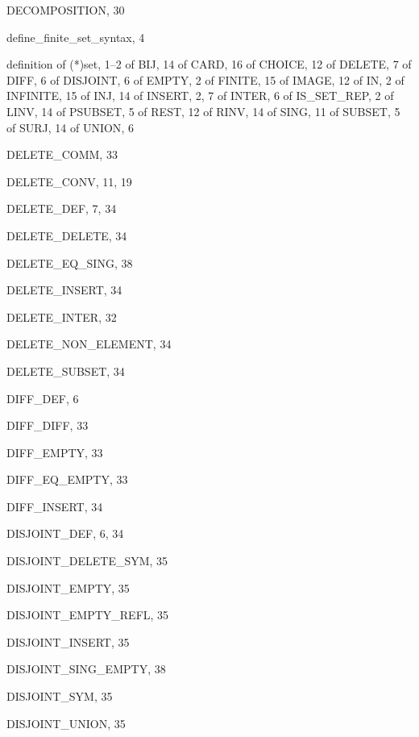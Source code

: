 \begin{theindex}
  \item {\ptt DECOMPOSITION}, 30
  \item {\ptt define\_finite\_set\_syntax}, 4
  \item definition
    \subitem of {\ptt (*)set}, 1--2
    \subitem of {\ptt BIJ}, 14
    \subitem of {\ptt CARD}, 16
    \subitem of {\ptt CHOICE}, 12
    \subitem of {\ptt DELETE}, 7
    \subitem of {\ptt DIFF}, 6
    \subitem of {\ptt DISJOINT}, 6
    \subitem of {\ptt EMPTY}, 2
    \subitem of {\ptt FINITE}, 15
    \subitem of {\ptt IMAGE}, 12
    \subitem of {\ptt IN}, 2
    \subitem of {\ptt INFINITE}, 15
    \subitem of {\ptt INJ}, 14
    \subitem of {\ptt INSERT}, 2, 7
    \subitem of {\ptt INTER}, 6
    \subitem of {\ptt IS\_SET\_REP}, 2
    \subitem of {\ptt LINV}, 14
    \subitem of {\ptt PSUBSET}, 5
    \subitem of {\ptt REST}, 12
    \subitem of {\ptt RINV}, 14
    \subitem of {\ptt SING}, 11
    \subitem of {\ptt SUBSET}, 5
    \subitem of {\ptt SURJ}, 14
    \subitem of {\ptt UNION}, 6
  \item {\ptt DELETE\_COMM}, 33
  \item {\ptt DELETE\_CONV}, 11, 19
  \item {\ptt DELETE\_DEF}, 7, 34
  \item {\ptt DELETE\_DELETE}, 34
  \item {\ptt DELETE\_EQ\_SING}, 38
  \item {\ptt DELETE\_INSERT}, 34
  \item {\ptt DELETE\_INTER}, 32
  \item {\ptt DELETE\_NON\_ELEMENT}, 34
  \item {\ptt DELETE\_SUBSET}, 34
  \item {\ptt DIFF\_DEF}, 6
  \item {\ptt DIFF\_DIFF}, 33
  \item {\ptt DIFF\_EMPTY}, 33
  \item {\ptt DIFF\_EQ\_EMPTY}, 33
  \item {\ptt DIFF\_INSERT}, 34
  \item {\ptt DISJOINT\_DEF}, 6, 34
  \item {\ptt DISJOINT\_DELETE\_SYM}, 35
  \item {\ptt DISJOINT\_EMPTY}, 35
  \item {\ptt DISJOINT\_EMPTY\_REFL}, 35
  \item {\ptt DISJOINT\_INSERT}, 35
  \item {\ptt DISJOINT\_SING\_EMPTY}, 38
  \item {\ptt DISJOINT\_SYM}, 35
  \item {\ptt DISJOINT\_UNION}, 35


\end{theindex}
